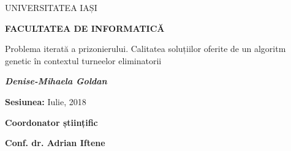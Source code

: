 \begin{center}
	\large{UNIVERSITATEA  IAȘI} \\
	\vspace{0.4cm}
	
	\large{\textbf{FACULTATEA DE INFORMATICĂ}} \\
    \vspace{4cm}
    
	\LARGE{Problema iterată a prizonierului. Calitatea soluțiilor oferite de un algoritm genetic în contextul turneelor eliminatorii} \\
	\vspace{3cm}
	
	\large{\textbf{\textit{Denise-Mihaela Goldan}}}\\
	\vspace{2.5cm}
	
	\large{\textbf{Sesiunea:} Iulie, 2018}\\
	\vspace{2.5cm}
	
	\large{\textbf{Coordonator științific}}\\
	\vspace{0.4cm}
	
	\large{\textbf{Conf. dr. Adrian Iftene}}
\end{center}

\clearpage

